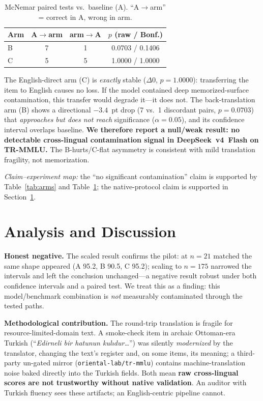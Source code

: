 \documentclass[11pt]{article}
\begin{document}
\begin{table}[t]
\centering
\small
\begin{tabular}{lccc}
\toprule
\textbf{Arm} & \textbf{A$\rightarrow$arm} & \textbf{arm$\rightarrow$A} & \textbf{$p$ (raw / Bonf.)}\\
\midrule
B & 7 & 1 & 0.0703 / 0.1406\\
C & 5 & 5 & 1.0000 / 1.0000\\
\bottomrule
\end{tabular}
\caption{McNemar paired tests vs.\ baseline (A). ``A$\rightarrow$arm'' = correct in A, wrong in arm.}
\label{tab:mcnemar}
\end{table}

The English-direct arm (C) is \emph{exactly} stable ($\Delta0$, $p{=}1.0000$): transferring the item to English causes no loss. If the model contained deep memorized-surface contamination, this transfer would degrade it---it does not. The back-translation arm (B) shows a directional $-3.4$~pt drop (7 vs.\ 1 discordant pairs, $p{=}0.0703$) that \emph{approaches but does not reach} significance ($\alpha{=}0.05$), and its confidence interval overlaps baseline. \textbf{We therefore report a null/weak result: no detectable cross-lingual contamination signal in DeepSeek~v4~Flash on TR-MMLU.} The B-hurts/C-flat asymmetry is consistent with mild translation fragility, not memorization.

\emph{Claim--experiment map:} the ``no significant contamination'' claim is supported by Table~\ref{tab:arms} and Table~\ref{tab:mcnemar}; the native-protocol claim is supported in Section~\ref{sec:analysis}.

\section{Analysis and Discussion}
\label{sec:analysis}

\textbf{Honest negative.} The scaled result confirms the pilot: at $n{=}21$ matched the same shape appeared (A 95.2, B 90.5, C 95.2); scaling to $n{=}175$ narrowed the intervals and left the conclusion unchanged---a negative result robust under both confidence intervals and a paired test. We treat this as a finding: this model/benchmark combination is \emph{not} measurably contaminated through the tested paths.

\textbf{Methodological contribution.} The round-trip translation is fragile for resource-limited-domain text. A smoke-check item in archaic Ottoman-era Turkish (``\emph{Edirneli bir hatunun kulıdur\ldots}'') was silently \emph{modernized} by the translator, changing the text's register and, on some items, its meaning; a third-party un-gated mirror (\texttt{oriental-lab/tr-mmlu}) contains machine-translation noise baked directly into the Turkish fields. Both mean \textbf{raw cross-lingual scores are not trustworthy without native validation}. An auditor with Turkish fluency sees these artifacts; an English-centric pipeline cannot.
\end{document}
